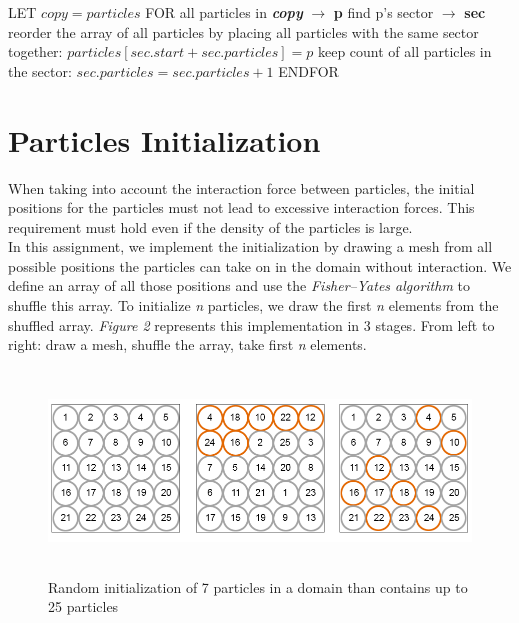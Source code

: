 \documentclass[a4paper,11pt]{article}
\newcommand\tab[1][4mm]{\hspace*{#1}}
\begin{document}
\begin{itemize}
LET $copy = particles$
FOR all particles in \textbf{\emph{copy}} $\rightarrow$ \textbf{p}
    \tab find p's sector $\rightarrow$ \textbf{sec}
    \tab reorder the array of all particles by placing all particles with the same sector together:
    \tab\tab $particles[sec.start + sec.particles] = p$
    \tab keep count of all particles in the sector: $sec.particles = sec.particles + 1$
ENDFOR

\egroup
\end{itemize}

\newpage
\section*{Particles Initialization}
When taking into account the interaction force between particles, the initial positions for the particles must not lead to excessive interaction forces. This requirement must hold even if the density of the particles is large.\\
In this assignment, we implement the initialization by drawing a mesh from all possible positions the particles can take on in the domain without interaction. We define an array of all those positions and use the \emph{Fisher–Yates algorithm} \cite{fy} to shuffle this array. To initialize \emph{n} particles, we draw the first \emph{n} elements from the shuffled array. \emph{Figure 2} represents this implementation in 3 stages. From left to right: draw a mesh, shuffle the array, take first \emph{n} elements.
\begin{figure}[!htb]
  \centering
  \includegraphics[width=16cm, height=5.4cm]{init.png}
  \caption{\small Random initialization of 7 particles in a domain than contains up to 25 particles}
\end{figure}
\end{document}
